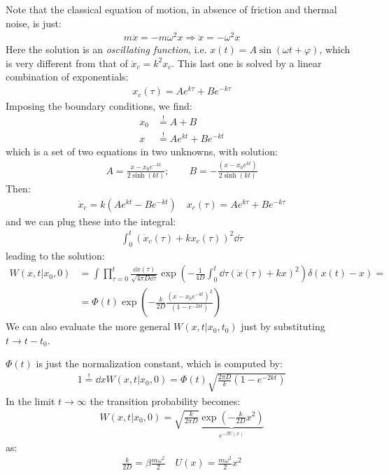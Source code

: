 \documentclass[../template.tex]{subfiles}
\begin{document}
Note that the classical equation of motion, in absence of friction and thermal noise, is just:
\begin{align*}
    m\ddot{x} = - m\omega^2 x \Rightarrow \ddot{x} = -\omega^2 x
\end{align*}
Here the solution is an \textit{oscillating function}, i.e. $x(t) = A\sin(\omega t + \varphi)$, which is very different from that of $\ddot{x}_c = k^2 x_c$. This last one is solved by a linear combination of exponentials:
\begin{align*}
    x_c(\tau) = A e^{k \tau} + B e^{-k \tau}
\end{align*}   
Imposing the boundary conditions, we find:
\begin{align*}
    x_0 &\overset{!}{=} A + B\\
    x &\overset{!}{=}  A e^{kt} + Be^{-kt} 
\end{align*}
which is a set of two equations in two unknowns, with solution:
\begin{align*}
    A = \frac{x-x_0 e^{-k t}}{2 \sinh(kt)}; \qquad B = -\frac{(x-x_0 e^{kt})}{2 \sinh(kt)} 
\end{align*}
Then:
\begin{align*}
    \dot{x}_c = k (A e^{kt} - B e^{-kt}) \quad x_c(\tau) = A e^{k \tau} + B e^{-k \tau}
\end{align*}
and we can plug these into the integral:
\begin{align*}
    \int_0^t (\dot{x}_c(\tau) + k x_c(\tau))^2 \dd{\tau}
\end{align*}
leading to the solution:
\begin{align*}
    W(x,t|x_0,0) &= \int \prod_{\tau = 0} ^t \frac{\dd{x(\tau)}}{\sqrt{4 \pi D \dd{\tau} }} \exp\left(-\frac{1}{4D} \int_0^t \dd{\tau}(\dot{x}(\tau) + kx)^2 \right) \delta(x(t)-x) =\\
    &= \Phi(t) \exp\left(-\frac{k}{2D} \frac{(x-x_0 e^{-kt})^2}{(1-e^{-2kt})} \right)
\end{align*}
We can also evaluate the more general $W(x,t|x_0,t_0)$ just by substituting $t \to t-t_0$.

$\Phi(t)$ is just the normalization constant, which is computed by:
\begin{align*}
    1 \overset{!}{=} \dd{x} W(x,t|x_0,0) = \Phi(t) \sqrt{\frac{2 \pi D}{k} (1 - e^{-2kt}) }
\end{align*} 
In the limit $t \to \infty$ the transition probability becomes:
\begin{align*}
    W(x,t|x_0, 0) = \sqrt{\frac{k}{2 \pi D} } \underbrace{\exp\left(-\frac{k}{2D} x^2\right)}_{e^{- \beta U(x)}} 
\end{align*} 
as:
\begin{align*}
    \frac{k}{2 D} = \beta \frac{m \omega^2}{2}  \quad U(x) = \frac{m\omega^2}{2} x^2  
\end{align*}
\end{document}
